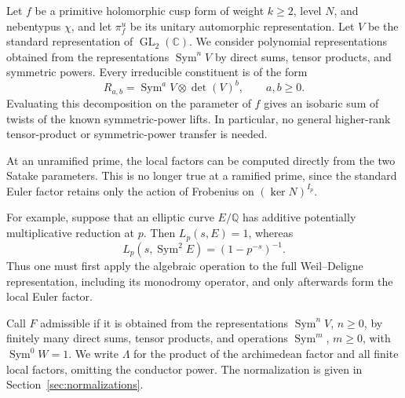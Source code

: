 \documentclass[11pt,reqno]{amsart}
\theoremstyle{definition}
\theoremstyle{remark}
\newcommand{\C}{\mathbb C}
\newcommand{\Q}{\mathbb Q}
\newcommand{\GL}{\operatorname{GL}}
\newcommand{\Sym}{\operatorname{Sym}}
\begin{document}
Let $f$ be a primitive holomorphic cusp form of weight $k\geq2$, level $N$, and nebentypus $\chi$, and let $\pi_f^u$ be its unitary automorphic representation.
Let $V$ be the standard representation of $\GL_2(\C)$.
We consider polynomial representations obtained from the representations $\Sym^nV$ by direct sums, tensor products, and symmetric powers.
Every irreducible constituent is of the form
\begin{equation}\label{eq:intro-atoms}
 R_{a,b}=\Sym^aV\otimes\det(V)^b,
 \qquad a,b\geq0.
\end{equation}
Evaluating this decomposition on the parameter of $f$ gives an isobaric sum of twists of the known symmetric-power lifts.
In particular, no general higher-rank tensor-product or symmetric-power transfer is needed.

At an unramified prime, the local factors can be computed directly from the two Satake parameters.
This is no longer true at a ramified prime, since the standard Euler factor retains only the action of Frobenius on $(\ker N)^{I_p}$.

For example, suppose that an elliptic curve $E/\Q$ has additive potentially multiplicative reduction at $p$.
Then $L_p(s,E)=1$, whereas
\begin{equation}\label{eq:intro-counterexample}
 L_p(s,\Sym^2 E)=(1-p^{-s})^{-1}.
\end{equation}
Thus one must first apply the algebraic operation to the full Weil--Deligne
representation, including its monodromy operator, and only afterwards form the local Euler factor.

Call $F$ admissible if it is obtained from the representations $\Sym^nV$, $n\geq0$, by finitely many direct sums, tensor products, and operations $\Sym^m$, $m\geq0$, with $\Sym^0W=1$.
We write $\Lambda$ for the product of the archimedean factor and all finite local factors, omitting the conductor power.
The normalization is given in Section~\ref{sec:normalizations}.
\end{document}
